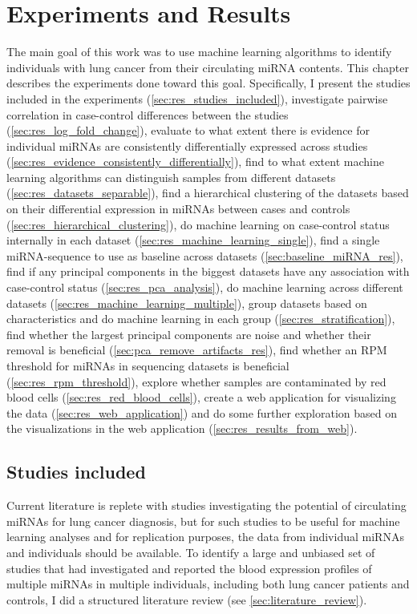 \chapter{Experiments and Results}
\label{cha:ResearchAndResults}

The main goal of this work was to use machine learning algorithms to identify individuals with lung cancer from their circulating miRNA contents. This chapter describes the experiments done toward this goal. Specifically, I present the studies included in the experiments (\autoref{sec:res_studies_included}), investigate pairwise correlation in case-control differences between the studies (\autoref{sec:res_log_fold_change}), evaluate to what extent there is evidence for individual miRNAs are consistently differentially expressed across studies (\autoref{sec:res_evidence_consistently_differentially}), find to what extent machine learning algorithms can distinguish samples from different datasets (\autoref{sec:res_datasets_separable}), find a hierarchical clustering of the datasets based on their differential expression in miRNAs between cases and controls (\autoref{sec:res_hierarchical_clustering}), do machine learning on case-control status internally in each dataset (\autoref{sec:res_machine_learning_single}), find a single miRNA-sequence to use as baseline across datasets (\autoref{sec:baseline_miRNA_res}), find if any principal components in the biggest datasets have any association with case-control status (\autoref{sec:res_pca_analysis}), do machine learning across different datasets (\autoref{sec:res_machine_learning_multiple}), group datasets based on characteristics and do machine learning in each group (\autoref{sec:res_stratification}), find whether the largest principal components are noise and whether their removal is beneficial (\autoref{sec:pca_remove_artifacts_res}), find whether an RPM threshold for miRNAs in sequencing datasets is beneficial (\autoref{sec:res_rpm_threshold}), explore whether samples are contaminated by red blood cells (\autoref{sec:res_red_blood_cells}), create a web application for visualizing the data (\autoref{sec:res_web_application}) and do some further exploration based on the visualizations in the web application (\autoref{sec:res_results_from_web}).

\section{Studies included}
\label{sec:res_studies_included}
Current literature is replete with studies investigating the potential of circulating miRNAs for lung cancer diagnosis, but for such studies to be useful for machine learning analyses and for replication purposes, the data from individual miRNAs and individuals should be available. To identify a large and unbiased set of studies that had investigated and reported the blood expression profiles of multiple miRNAs in multiple individuals, including both lung cancer patients and controls, I did a structured literature review (see \autoref{sec:literature_review}). 

